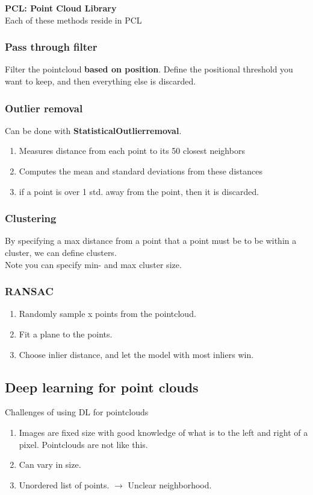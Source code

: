 \documentclass[a4paper]{article}
\begin{document}
\textbf{PCL: Point Cloud Library} \\
Each of these methods reside in PCL

\subsubsection*{Pass through filter}
Filter the pointcloud \textbf{based on position}. 
Define the positional threshold you want to keep, and then everything else is discarded. 

\subsubsection*{Outlier removal}
Can be done with \textbf{StatisticalOutlierremoval}.

\begin{enumerate}
	\item Measures distance from each point to its 50 closest neighbors
	\item Computes the mean and standard deviations from these distances
	\item if a point is over 1 std. away from the point, then it is discarded. 
\end{enumerate}

\subsubsection*{Clustering}
By specifying a max distance from a point that a point must be to be within a cluster, we can define clusters. \\
Note you can specify min- and max cluster size. 



\subsubsection*{RANSAC}
\begin{enumerate}
	\item Randomly sample x points from the pointcloud.
	\item Fit a plane to the points.
	\item Choose inlier distance, and let the model with most inliers win. 
\end{enumerate}

\newpage
\subsection{Deep learning for point clouds}
Challenges of using DL for pointclouds
\begin{enumerate}
	\item Images are fixed size with good knowledge of what is to the left and right of a pixel. Pointclouds are not like this.
	\item Can vary in size. 
	\item Unordered list of points. $ \rightarrow $ Unclear neighborhood. 
\end{enumerate}
\end{document}
